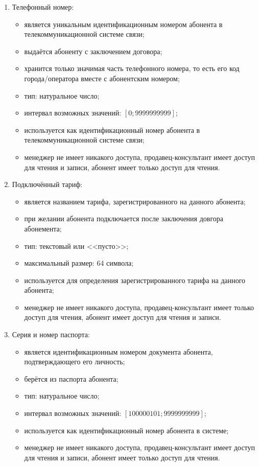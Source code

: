 \begin{enumerate}
\begin{enumerate}
        \item Телефонный номер:
        \begin{itemize}
            \item является уникальным идентификационным номером абонента в телекоммуникационной системе связи;
            \item выдаётся абоненту с заключением договора;
            \item хранится только значимая часть телефонного номера, то есть его код города/оператора вместе с абонентским номером; 
            \item тип: натуральное число;
            \item интервал возможных значений: $[0; 9 999 999 999]$;
            \item используется как идентификационный номер абонента в телекоммуникационной системе связи;
            \item менеджер не имеет никакого доступа, продавец-консультант имеет доступ для чтения и записи, абонент имеет только доступ для чтения.
        \end{itemize}

        \item Подключённый тариф:
        \begin{itemize}
            \item является названием тарифа, зарегистрированного на данного абонента;
            \item при желании абонента подключается после заключения довгора абонемента;
            \item тип: текстовый или <<пусто>>;
            \item максимальный размер: 64 символа; %
            \item используется для определения зарегистрированного тарифа на данного абонента;
            \item менеджер не имеет никакого доступа, продавец-консультант имеет только доступ для чтения, абонент имеет доступ для чтения и записи.
        \end{itemize}

        \item Серия и номер паспорта:
        \begin{itemize}
            \item является идентификационным номером документа абонента, подтверждающего его личность;
            \item берётся из паспорта абонента;
            \item тип: натуральное число;
            \item интервал возможных значений: $[100000101; 9 999 999 999]$;
            \item используется как идентификационный номер абонента в системе;
            \item менеджер не имеет никакого доступа, продавец-консультант имеет доступ для чтения и записи, абонент имеет только доступ для чтения.
        \end{itemize}


\end{enumerate}
\end{enumerate}
